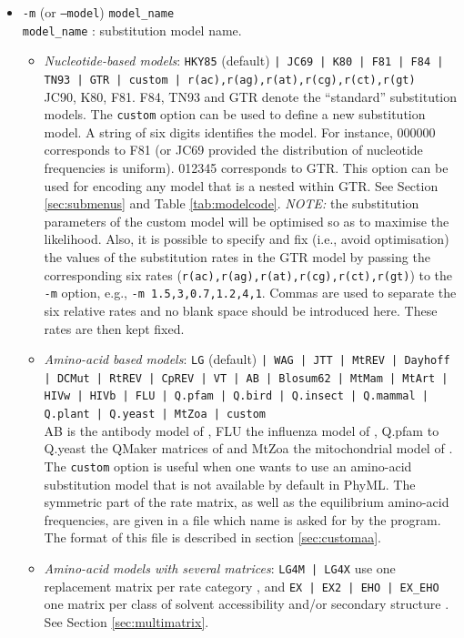\documentclass[a4paper,12pt]{article}
\newcommand{\x}[1]{\texttt{#1}}
\begin{document}
\begin{itemize}
\item \x{-m} (or \x{--model}) \x{model\_name}\index{command-line options!\x{--model}} \\
\x{model\_name} : substitution model name.
\begin{itemize}
\item {\it Nucleotide-based models}: \x{HKY85} (default) \x{| JC69 |  K80 | F81 | F84 | TN93 | GTR |
    custom | r(ac),r(ag),r(at),r(cg),r(ct),r(gt)} \\ JC90, K80, F81. F84, TN93 and GTR denote the
  ``standard'' substitution models. The \x{custom} option can be  used to define a  new substitution model. A  string of six
digits  identifies  the model.  For  instance,  000000 corresponds  to  F81  (or  JC69 provided  the
distribution of nucleotide  frequencies is uniform).  012345 corresponds to GTR.  This option can be
used for encoding any model that is a nested within GTR. See Section \ref{sec:submenus} and Table \ref{tab:modelcode}. {\em NOTE:}
the  substitution  parameters  of  the  custom  model  will be  optimised  so  as  to  maximise  the
likelihood.  Also, it is  possible  to  specify and  fix  (i.e., avoid  optimisation)  the  values of  the
substitution rates in the GTR model by passing the corresponding six rates
(\x{r(ac),r(ag),r(at),r(cg),r(ct),r(gt)}) to the \x{-m} option, e.g., \x{-m 1.5,3,0.7,1.2,4,1}.
Commas are used to separate the six relative rates and no blank space should be introduced here.
These rates are then kept fixed.

\item {\it Amino-acid based models}: \x{LG} (default) \x{| WAG | JTT | MtREV | Dayhoff | DCMut | RtREV
 | CpREV | VT | AB | Blosum62 | MtMam | MtArt | HIVw |  HIVb | FLU | Q.pfam | Q.bird | Q.insect | Q.mammal
 | Q.plant | Q.yeast | MtZoa | custom} \\
AB is the antibody model of \cite{mirsky15}, FLU the influenza model of \cite{dang10}, Q.pfam to
Q.yeast the QMaker matrices of \cite{minh22} and MtZoa the mitochondrial model of
\cite{rotastabelli09}. The \x{custom} option is  useful when one wants to use an amino-acid  substitution model that is not
available by  default in PhyML. The  symmetric part of the  rate matrix, as well  as the equilibrium
amino-acid frequencies, are  given in a file which name  is asked for by the  program. The format of
this file is described in section \ref{sec:customaa}.

\item {\it Amino-acid models with several matrices}: \x{LG4M | LG4X} use one replacement matrix
per rate category \cite{lg4x}, and \x{EX | EX2 | EHO | EX\_EHO} one matrix per class of solvent
accessibility and/or secondary structure \cite{le10}. See Section \ref{sec:multimatrix}.
\end{itemize}


\end{itemize}
\end{document}
